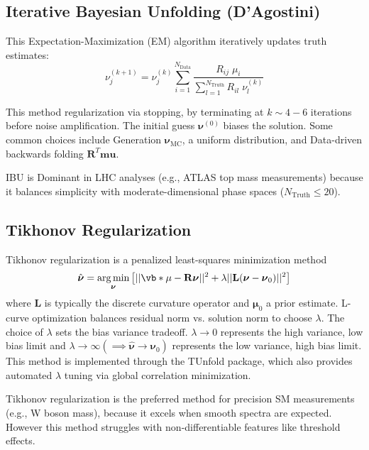 \subsection{Iterative Bayesian Unfolding (D’Agostini)}  
This Expectation-Maximization (EM) algorithm iteratively updates truth estimates:  
\begin{equation}
    \nu_j^{(k+1)} = \nu_j^{(k)} \sum_{i=1}^{N_{\text{Data}}} \frac{R_{ij}\; \mu_i}{\sum_{l=1}^{N_{\text{Truth}}} R_{il} \;\nu_l^{(k)}}
\end{equation}  

This method regularization via stopping, by terminating at \(k \sim 4-6\) iterations before noise amplification.
%
The initial guess \(\boldsymbol{\nu}^{(0)}\) biases the solution.
%
Some common choices include Generation \(\boldsymbol{\nu}_{\text{MC}}\), a uniform distribution, and Data-driven backwards folding \(\mathbf{R}^T \mathbf{mu}\).

IBU is Dominant in LHC analyses (e.g., ATLAS top mass measurements) because it balances simplicity with moderate-dimensional phase spaces (\(N_{\text{Truth}} \leq 20\)).

\subsection{Tikhonov Regularization}  
Tikhonov regularization is a penalized least-squares minimization method
\begin{equation}
    \hat{\boldsymbol{\nu}} =\underset{\boldsymbol{\nu}}{\arg\min} \left[ ||\vb*{\mu} - \mathbf{R}\boldsymbol{\nu}||^2 + \lambda ||\mathbf{L}(\boldsymbol{\nu} - \boldsymbol{\nu}_0)||^2 \right]
\end{equation}  
where \(\mathbf{L}\) is typically the discrete curvature operator and \(\boldsymbol{\mu}_0\) a prior estimate.  
%
L-curve optimization balances residual norm vs. solution norm to choose \(\lambda\).
%
The choice of \(\lambda\) sets the bias variance tradeoff.
%
\(\lambda \rightarrow 0\) represents the high variance, low bias limit and \(\lambda \rightarrow \infty (\implies \hat{\boldsymbol{\nu}} \rightarrow \boldsymbol{\nu}_0)\) represents the low variance, high bias limit.
%
This method is implemented through the TUnfold package, which also provides automated \(\lambda\) tuning via global correlation minimization.

Tikhonov regularization is the preferred method for precision SM measurements (e.g., W boson mass), because it excels when smooth spectra are expected.
%
However this method struggles with non-differentiable features like threshold effects.

